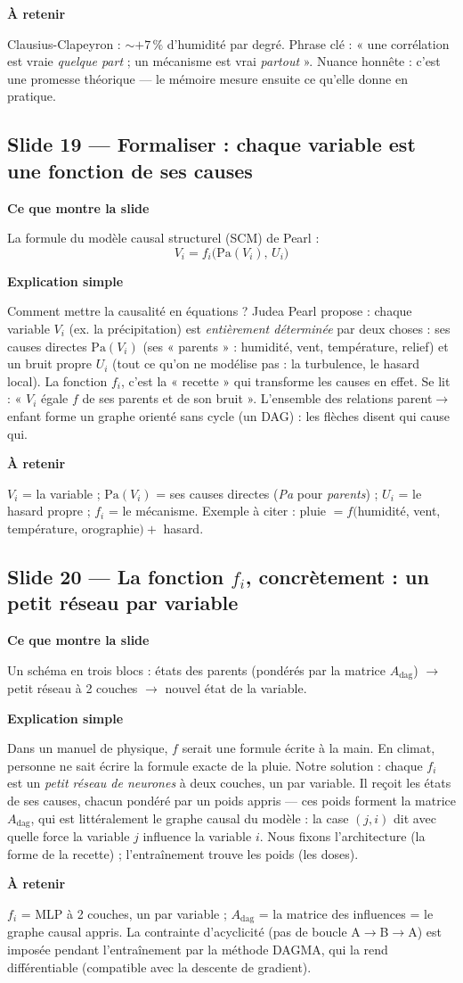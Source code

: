 \documentclass[11pt,a4paper]{article}
\newcommand{\slide}[2]{\subsection*{\textcolor{bleu}{Slide #1 --- #2}}}
\newcommand{\bloc}[1]{\par\medskip\noindent\textcolor{accent}{\textbf{#1}}\par\nopagebreak\smallskip}
\begin{document}
\bloc{À retenir}
Clausius-Clapeyron : $\sim +7\,\%$ d'humidité par degré. Phrase clé : « une corrélation est vraie \emph{quelque part} ; un mécanisme est vrai \emph{partout} ». Nuance honnête : c'est une promesse théorique --- le mémoire mesure ensuite ce qu'elle donne en pratique.

\slide{19}{Formaliser : chaque variable est une fonction de ses causes}

\bloc{Ce que montre la slide}
La formule du modèle causal structurel (SCM) de Pearl :
\[ V_i = f_i\big(\mathrm{Pa}(V_i),\, U_i\big) \]

\bloc{Explication simple}
Comment mettre la causalité en équations ? Judea Pearl propose : chaque variable $V_i$ (ex. la précipitation) est \emph{entièrement déterminée} par deux choses : ses causes directes $\mathrm{Pa}(V_i)$ (ses « parents » : humidité, vent, température, relief) et un bruit propre $U_i$ (tout ce qu'on ne modélise pas : la turbulence, le hasard local). La fonction $f_i$, c'est la « recette » qui transforme les causes en effet. Se lit : « $V_i$ égale $f$ de ses parents et de son bruit ». L'ensemble des relations parent$\to$enfant forme un graphe orienté sans cycle (un DAG) : les flèches disent qui cause qui.

\bloc{À retenir}
$V_i$ = la variable ; $\mathrm{Pa}(V_i)$ = ses causes directes (\emph{Pa} pour \emph{parents}) ; $U_i$ = le hasard propre ; $f_i$ = le mécanisme. Exemple à citer : pluie $= f($humidité, vent, température, orographie$) + $ hasard.

\slide{20}{La fonction $f_i$, concrètement : un petit réseau par variable}

\bloc{Ce que montre la slide}
Un schéma en trois blocs : états des parents (pondérés par la matrice $A_{\mathrm{dag}}$) $\to$ petit réseau à 2 couches $\to$ nouvel état de la variable.

\bloc{Explication simple}
Dans un manuel de physique, $f$ serait une formule écrite à la main. En climat, personne ne sait écrire la formule exacte de la pluie. Notre solution : chaque $f_i$ est un \emph{petit réseau de neurones} à deux couches, un par variable. Il reçoit les états de ses causes, chacun pondéré par un poids appris --- ces poids forment la matrice $A_{\mathrm{dag}}$, qui est littéralement le graphe causal du modèle : la case $(j,i)$ dit avec quelle force la variable $j$ influence la variable $i$. Nous fixons l'architecture (la forme de la recette) ; l'entraînement trouve les poids (les doses).

\bloc{À retenir}
$f_i$ = MLP à 2 couches, un par variable ; $A_{\mathrm{dag}}$ = la matrice des influences = le graphe causal appris. La contrainte d'acyclicité (pas de boucle A$\to$B$\to$A) est imposée pendant l'entraînement par la méthode DAGMA, qui la rend différentiable (compatible avec la descente de gradient).
\end{document}
